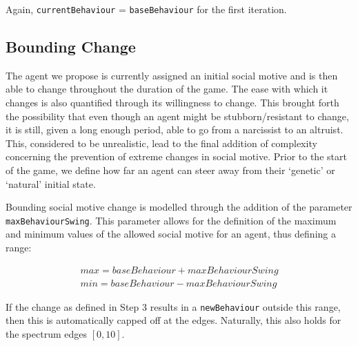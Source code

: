 Again, \texttt{currentBehaviour} = \texttt{baseBehaviour} for the first iteration.

\subsection{Bounding Change}
The agent we propose is currently assigned an initial social motive and is then able to change throughout the duration of the game. The ease with which it changes is also quantified through its willingness to change. This brought forth the possibility that even though an agent might be stubborn/resistant to change, it is still, given a long enough period, able to go from a narcissist to an altruist. This, considered to be unrealistic, lead to the final addition of complexity concerning the prevention of extreme changes in social motive. Prior to the start of the game, we define how far an agent can steer away from their `genetic' or `natural' initial state.

Bounding social motive change is modelled through the addition of the parameter \texttt{maxBehaviourSwing}. This parameter allows for the definition of the maximum and minimum values of the allowed social motive for an agent, thus defining a range:

\vspace{0.2cm}
\begin{equation}
    \begin{gathered}
    \mathit{max = baseBehaviour + maxBehaviourSwing}  \\
    \mathit{min = baseBehaviour - maxBehaviourSwing}
    \end{gathered}
\end{equation}
\vspace{0.2cm}

If the change as defined in Step 3 results in a \texttt{newBehaviour} outside this range, then this is automatically capped off at the edges. Naturally, this also holds for the spectrum edges $[0,10]$.







